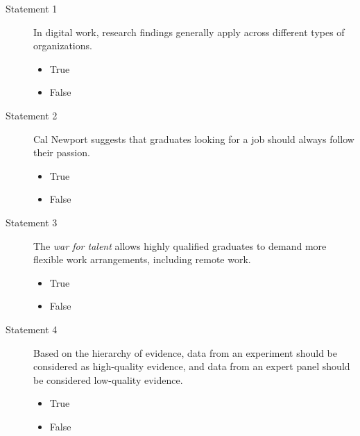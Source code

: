 \documentclass[12pt]{scrartcl}
\begin{document}
\begin{description}


	\item[Statement 1] In digital work, research findings generally apply across different types of organizations.

	\begin{multicols}{2}
		\begin{itemize}[label={\Square}]
			\item True
			\item[\checkmark] False
		\end{itemize}
	\end{multicols}



	\item[Statement 2] Cal Newport suggests that graduates looking for a job should always follow their passion.
	
	\begin{multicols}{2}
		\begin{itemize}[label={\Square}]
			\item True
			\item[\checkmark] False
		\end{itemize}
	\end{multicols}


	\item[Statement 3] The \textit{war for talent} allows highly qualified graduates to demand more flexible work arrangements, including remote work.

	\begin{multicols}{2}
		\begin{itemize}[label={\Square}]
			\item[\checkmark] True
			\item False
		\end{itemize}
	\end{multicols}


	\item[Statement 4] Based on the hierarchy of evidence, data from an experiment should be considered as high-quality evidence, and data from an expert panel should be considered low-quality evidence.

	\begin{multicols}{2}
		\begin{itemize}[label={\Square}]
			\item[\checkmark] True
			\item False
		\end{itemize}
	\end{multicols}



\end{description}
\end{document}
